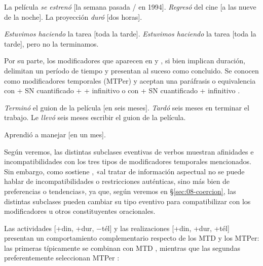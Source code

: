 \begin{exe}
  \ex\label{ex:08-estreno} La película \textit{se estrenó} [la semana pasada / en
      1994].
  \ex\label{ex:08-regreso} \textit{Regresó} del cine [a las nueve de la noche].
  \ex\label{ex:08-duro} La proyección \textit{duró} [dos horas].
  \ex\label{ex:08-tarea}
    \begin{xlist}
      \ex\label{ex:08-tarea-a} \textit{Estuvimos haciendo} la tarea [toda la
          tarde].
      \ex\label{ex:08-tarea-b} \textit{Estuvimos haciendo} la tarea [toda la
          tarde], pero no la terminamos.
    \end{xlist}
\end{exe}

Por su parte, los modificadores que aparecen en  y
, si bien implican duración, delimitan un período de tiempo
y presentan al suceso como concluido. Se conocen como modificadores temporales
 (MTPer) y aceptan una paráfrasis o equivalencia con
 + SN cuantificado +  + infinitivo
 o con  + SN cuantificado +
infinitivo .

\begin{exe}
  \ex\label{ex:08-guion}
    \begin{xlist}
      \ex \textit{Terminó} el guion de la película [en seis meses].
      \ex\label{ex:08-guion-b} \textit{Tardó} seis meses en terminar el trabajo.
      \ex\label{ex:08-guion-c} Le \textit{llevó} seis meses escribir el guion de
          la película.
    \end{xlist}
  \ex\label{ex:08-manejar} Aprendió a manejar [en un mes].
\end{exe}

Según veremos, las distintas subclases eventivas de verbos muestran afinidades e
incompatibilidades con los tres tipos de modificadores temporales mencionados.
Sin embargo, como sostiene \textcite[3047]{demiguel1999}, «al tratar de
información aspectual no se puede hablar de incompatibilidades o restricciones
auténticas, sino más bien de preferencias o tendencias», ya que, según veremos
en §\ref{sec:08-coercion}, las distintas subclases pueden cambiar su tipo
eventivo para compatibilizar con los modificadores u otros constituyentes
oracionales.

Las actividades [+din, +dur, $-$tél] y las realizaciones [+din, +dur, +tél]
presentan un comportamiento complementario respecto de los MTD y los MTPer: las
primeras típicamente se combinan con MTD , mientras que las
segundas preferentemente seleccionan MTPer :

